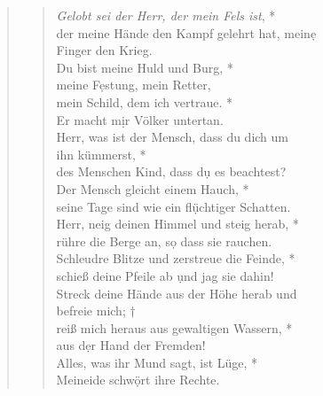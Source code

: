 \begin{quote}
\vspace{0.3cm}

\def\greinitialformat#1{{\fontsize{40}{40}\selectfont #1}}
\gresetfirstlineaboveinitial{\small \textcolor{red}{Ps 144}}{}
\setaboveinitialseparation{0.72mm}

\vspace{0.3cm}


 
\begin{verse}
 \textit{Gelobt sei der Herr, der mein Fels ist}, *\\
der meine Hände den Kampf gelehrt hat, mein\d e\\ Finger den Krieg.\\ \vin  
Du bist meine Huld und Burg, * \\ \vin 
meine F\d estung, mein Retter, \\
mein Schild, dem ich vertraue. *\\ Er macht m\d ir Völker untertan. \\ \vin 
Herr, was ist der Mensch, dass du dich um \\ \vin ihn kümmerst, *\\ \vin 
des Menschen Kind, dass d\d u es beachtest? \\
Der Mensch gleicht einem Hauch, *\\
seine Tage sind wie ein fl\d üchtiger Schatten.\\ \vin  
Herr, neig deinen Himmel und steig herab, *\\ \vin 
rühre die Berge an, s\d o dass sie rauchen.\\ 
Schleudre Blitze und zerstreue die Feinde, *\\
schieß deine Pfeile ab \d und jag sie dahin!\\ \vin 
Streck deine Hände aus der Höhe herab und\\ \vin  befreie mich; †\\ \vin 
reiß mich heraus aus gewaltigen Wassern, *\\ \vin  aus d\d er Hand der Fremden!\\
Alles, was ihr Mund sagt, ist Lüge, *\\
Meineide schw\d ört ihre Rechte.\\
\end{verse}




\end{quote}
